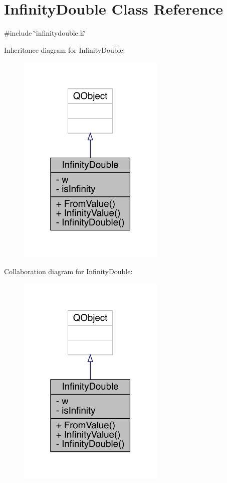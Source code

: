 \hypertarget{a00161}{}\section{Infinity\+Double Class Reference}
\label{a00161}


{\ttfamily \#include \char`\"{}infinitydouble.\+h\char`\"{}}



Inheritance diagram for Infinity\+Double\+:
\nopagebreak
\begin{figure}[H]
\begin{center}
\leavevmode
\includegraphics[width=199pt]{de/d38/a00160}
\end{center}
\end{figure}


Collaboration diagram for Infinity\+Double\+:
\nopagebreak
\begin{figure}[H]
\begin{center}
\leavevmode
\includegraphics[width=199pt]{de/db9/a00159}
\end{center}
\end{figure}
